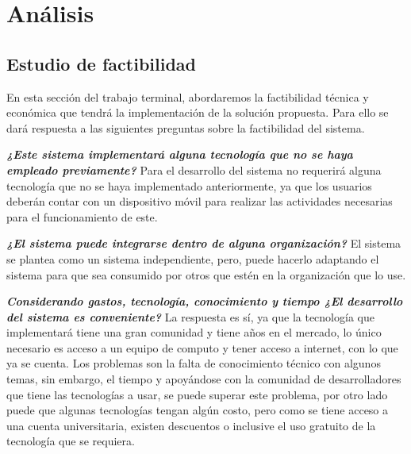 \chapter{Análisis} \label{analisis}
\vspace*{2cm}

\section{Estudio de factibilidad}
En esta sección del trabajo terminal, abordaremos la factibilidad técnica y económica que tendrá la implementación de la solución propuesta. Para ello se dará respuesta a las siguientes preguntas sobre la factibilidad del sistema.

\textbf{\textit{¿Este sistema implementará alguna tecnología que no se haya empleado previamente?}}\newline
Para el desarrollo del sistema no requerirá alguna tecnología que no se haya implementado anteriormente, ya que los usuarios deberán contar con un dispositivo móvil para realizar las actividades necesarias para el funcionamiento de este. 

\textbf{\textit{¿El sistema puede integrarse dentro de alguna organización?}}\newline
El sistema se plantea como un sistema independiente, pero, puede hacerlo adaptando el sistema para que sea consumido por otros que estén en la organización que lo use.

\textbf{\textit{Considerando gastos, tecnología, conocimiento y tiempo ¿El desarrollo del sistema es conveniente?}}\newline
La respuesta es sí, ya que la tecnología que implementará tiene una gran comunidad y tiene años en el mercado, lo único necesario es acceso a un equipo de computo y tener acceso a internet, con lo que ya se cuenta. Los problemas son la falta de conocimiento técnico con algunos temas, sin embargo, el tiempo y apoyándose con la comunidad de desarrolladores que tiene las tecnologías a usar, se puede superar este problema, por otro lado puede que algunas tecnologías tengan algún costo, pero como se tiene acceso a una cuenta universitaria, existen descuentos o inclusive el uso gratuito de la tecnología que se requiera.

